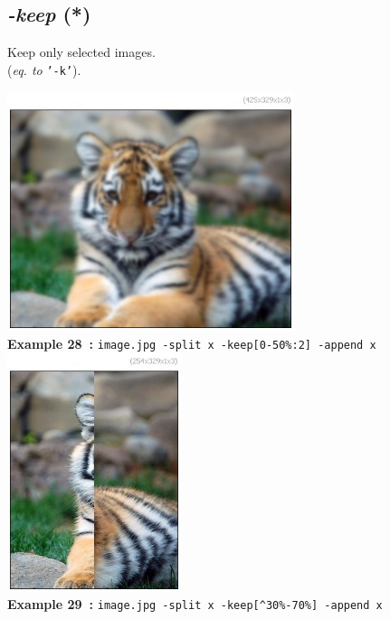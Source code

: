 \documentclass[a4paper,11pt,twoside]{book}
\begin{document}
\subsection{\emph{-keep} (*)}\vspace*{-0.5em}
Keep only selected images.
~\\(\emph{eq. to} {\small \texttt{'-k'}}).
\begin{center}\includegraphics[keepaspectratio=true,height=7cm,width=\textwidth]{img/gmic_def28.jpg}\\
{\footnotesize \textbf{Example 28~:} \texttt{image.jpg -split x -keep[0-50\%:2] -append x}}
\\\includegraphics[keepaspectratio=true,height=7cm,width=\textwidth]{img/gmic_def29.jpg}\\
{\footnotesize \textbf{Example 29~:} \texttt{image.jpg -split x -keep[\textasciicircum 30\%-70\%] -append x}}
\end{center}
\end{document}
